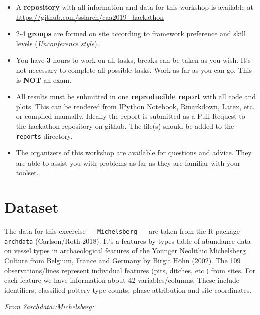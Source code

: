 \documentclass[a3, ruledsections, 8pt]{sciposter}
\begin{document}
\begin{itemize}
\item A \textbf{repository} with all information and data for this workshop is available at \newline \url{https://github.com/sslarch/caa2019_hackathon}
\item 2-4 \textbf {groups} are formed on site according to framework preference and skill levels (\textit{Unconference style}).
\item You have \textbf{3} hours to work on all tasks, breaks can be taken as you wish. It's not necessary to complete all possible tasks. Work as far as you can go. This is \textbf{NOT} an exam.
\item All results must be submitted in one \textbf{reproducible report} with all code and plots. This can be rendered from IPython Notebook, Rmarkdown, Latex, etc. or compiled manually. Ideally the report is submitted as a Pull Request to the hackathon repository on github. The file(s) should be added to the \verb|reports| directory.
\item The organizers of this workshop are available for questions and advice. They are able to assist you with problems as far as they are familiar with your toolset.
\end{itemize}

\section{Dataset}

The data for this excercise --- \verb|Michelsberg| --- are taken from the R package \verb|archdata| (Carlson/Roth 2018). It's a features by types table of abundance data on vessel types in archaeological features of the Younger Neolithic Michelsberg Culture from Belgium, France and Germany by Birgit Höhn (2002). The 109 observations/lines represent individual features (pits, ditches, etc.) from sites. For each feature we have information about 42 variables/columns. These include identifiers, classified pottery type counts, phase attribution and site coordinates.

\bigskip

\textit{From ?archdata::Michelsberg:}
\end{document}
